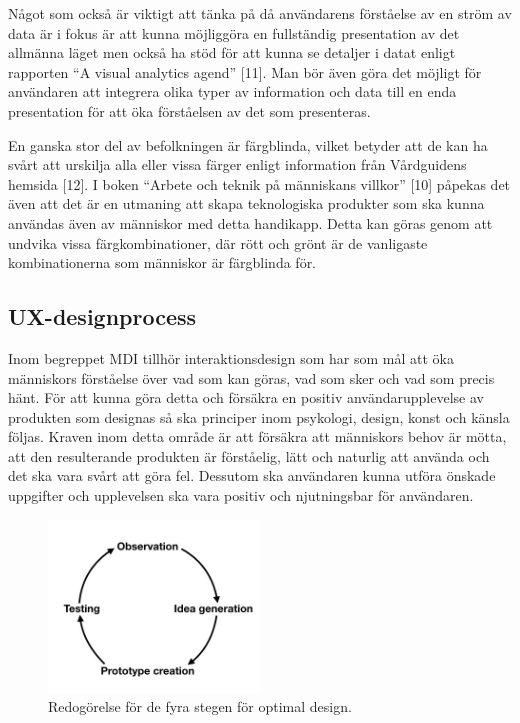 \documentclass[12pt]{kththesis}
\begin{document}
Något som också är viktigt att tänka på då användarens förståelse av en ström av data är i fokus är att kunna möjliggöra en fullständig presentation av det allmänna läget men också ha stöd för att kunna se detaljer i datat enligt rapporten “A visual analytics agend” [11]. Man bör även göra det möjligt för användaren att integrera olika typer av information och data till en enda presentation för att öka förståelsen av det som presenteras.

En ganska stor del av befolkningen är färgblinda, vilket betyder att de kan ha svårt att urskilja alla eller vissa färger enligt information från Vårdguidens hemsida [12]. I boken “Arbete och teknik på människans villkor” [10] påpekas det även att det är en utmaning att skapa teknologiska produkter som ska kunna användas även av människor med detta handikapp. Detta kan göras genom att undvika vissa färgkombinationer, där rött och grönt är de vanligaste kombinationerna som människor är färgblinda för.


\subsection{UX-designprocess}


Inom begreppet MDI tillhör interaktionsdesign som har som mål att öka människors förståelse över vad som kan göras, vad som sker och vad som precis hänt. För att kunna göra detta och försäkra en positiv användarupplevelse av produkten som designas så ska principer inom psykologi, design, konst och känsla följas. Kraven inom detta område är att försäkra att människors behov är mötta, att den resulterande produkten är förståelig, lätt och naturlig att använda och det ska vara svårt att göra fel. Dessutom ska användaren kunna utföra önskade uppgifter och upplevelsen ska vara positiv och njutningsbar för användaren.                    

\captionsetup[figure]{name=Figur}

\begin{figure}[h]
\centering
\includegraphics[width=0.5\textwidth]{PrototypeCreation}
\caption{Redogörelse för de fyra stegen för optimal design.}
\end{figure}
\end{document}
